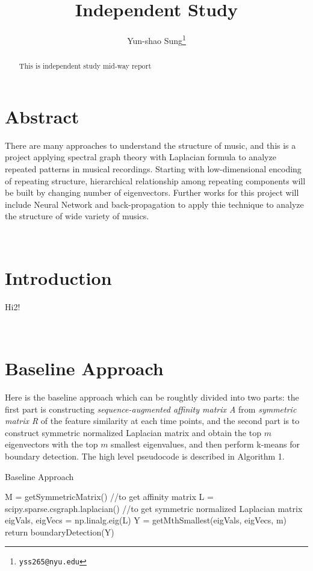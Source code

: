 \documentclass[final]{siamltexmm}
\title{Independent Study}
\author{Yun-shao Sung\thanks{\tt yss265@nyu.edu} }
\begin{document}
\maketitle

\begin{abstract}
This is independent study mid-way report
\end{abstract}

\pagestyle{myheadings}
\thispagestyle{plain}

\section{Abstract}
There are many approaches to understand the structure of music, and this is a project applying spectral graph theory with Laplacian formula to analyze repeated patterns in musical recordings. Starting with low-dimensional encoding of repeating structure, hierarchical relationship among repeating components will be built by changing number of eigenvectors. Further works for this project will include Neural Network and back-propagation to apply thie technique to analyze the structure of wide variety of musics.

\\
\section{Introduction}
Hi2!

\\
\section{Baseline Approach}
Here is the baseline approach which can be roughtly divided into two parts: the first part is constructing \textit{sequence-augmented affinity matrix A} from \textit{symmetric matrix R} of the feature similarity at each time points, and the second part is to construct symmetric normalized Laplacian matrix and obtain the top $m$ eigenvectors with the top $m$ smallest eigenvalues, and then perform k-means for boundary detection. The high level pseudocode is described in Algorithm 1.

\begin{algorithm}[htb]
  \caption{Baseline Approach}
  \label{algo:SC}
\begin{algorithmic}[1]
  \STATE M = getSymmetricMatrix() //to get affinity matrix
  \STATE L = scipy.sparse.csgraph.laplacian() //to get symmetric normalized Laplacian matrix
  \STATE eigVals, eigVecs = np.linalg.eig(L)
  \STATE Y = getMthSmallest(eigVals, eigVecs, m)
  \STATE return boundaryDetection(Y)
\end{algorithmic}
\end{algorithm}
\end{document}
